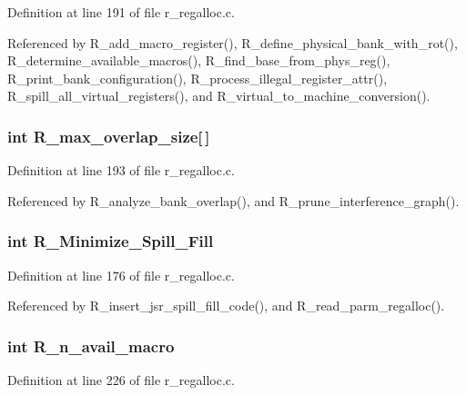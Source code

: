 Definition at line 191 of file r\_\-regalloc.c.

Referenced by R\_\-add\_\-macro\_\-register(), R\_\-define\_\-physical\_\-bank\_\-with\_\-rot(), R\_\-determine\_\-available\_\-macros(), R\_\-find\_\-base\_\-from\_\-phys\_\-reg(), R\_\-print\_\-bank\_\-configuration(), R\_\-process\_\-illegal\_\-register\_\-attr(), R\_\-spill\_\-all\_\-virtual\_\-registers(), and R\_\-virtual\_\-to\_\-machine\_\-conversion().
\subsubsection{\setlength{\rightskip}{0pt plus 5cm}int \bf{R\_\-max\_\-overlap\_\-size}[$\,$]}\label{r__regalloc_8h_1ca8cd6a6d677e658bc2fa42c4cb29f5}




Definition at line 193 of file r\_\-regalloc.c.

Referenced by R\_\-analyze\_\-bank\_\-overlap(), and R\_\-prune\_\-interference\_\-graph().
\subsubsection{\setlength{\rightskip}{0pt plus 5cm}int \bf{R\_\-Minimize\_\-Spill\_\-Fill}}\label{r__regalloc_8h_4458f3f27c27bed0125cfce6a72e9839}




Definition at line 176 of file r\_\-regalloc.c.

Referenced by R\_\-insert\_\-jsr\_\-spill\_\-fill\_\-code(), and R\_\-read\_\-parm\_\-regalloc().
\subsubsection{\setlength{\rightskip}{0pt plus 5cm}int \bf{R\_\-n\_\-avail\_\-macro}}\label{r__regalloc_8h_214508ad8172ac6738e54d61bc4e4869}




Definition at line 226 of file r\_\-regalloc.c.


